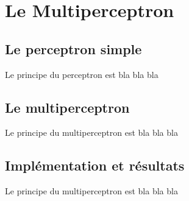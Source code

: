 \chapter{Le Multiperceptron}

\section{Le perceptron simple}
Le principe du perceptron est bla bla bla

\section{Le multiperceptron}
Le principe du multiperceptron est bla bla bla

\section{Implémentation et résultats}
Le principe du multiperceptron est bla bla bla
